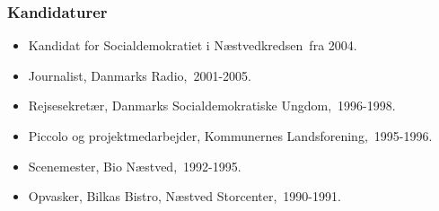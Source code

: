 \documentclass[11pt, a4paper]{awesome-cv}
\begin{document}
\begin{cvletter}
\subsubsection*{Kandidaturer}
\begin{itemize}
\item Kandidat for Socialdemokratiet i Næstvedkredsen fra 2004.
\end{itemize}
\begin{itemize}
\item Journalist, Danmarks Radio, 2001-2005.
\item Rejsesekretær, Danmarks Socialdemokratiske Ungdom, 1996-1998.
\item Piccolo og projektmedarbejder, Kommunernes Landsforening, 1995-1996.
\item Scenemester, Bio Næstved, 1992-1995.
\item Opvasker, Bilkas Bistro, Næstved Storcenter, 1990-1991.
\end{itemize}
\end{cvletter}
\end{document}
